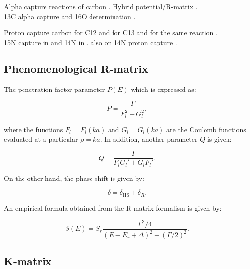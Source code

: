 \documentclass[openany]{book}
\begin{document}
Alpha capture reactions of carbon \cite{schurmann_gialanella_kunz_strieder_2012}.  Hybrid potential/R-matrix \cite{sparenberg_2005}. \\ 13C alpha capture and 16O determination \cite{prusachenko_bobrovsky_bondarenko_bokhovko_gurbich_ketlerov_2022}.

Proton capture carbon \cite{burtebaev_igamov_peterson_yarmukhamedov_zazulin_2008} for C12 and \cite{chakraborty_deboer_mukherjee_roy_2015} for C13 and \cite{genard_descouvemont_terwagne_2010} for the same reaction . \\

15N capture in \cite{barker_2008} and 14N in \cite{angulo_champagne_trautvetter_2005}. also on 14N proton capture \cite{formicola_imbriani_costantini_angulo_bemmerer_bonetti_broggini_corvisiero_cruz_descouvemont_et_2004}.

\subsection{Phenomenological R-matrix} \label{sub:rmatrix_phenomenological}

The penetration factor parameter $P(E)$ which is expressed as: 

\begin{equation} \label{eq:rmatrix_penetrationFactor}
	P= \frac{\Gamma}{F_l^2 + G_l^2},
\end{equation}

where the functions $F_l = F_l(ka)$ and $G_l = G_l(ka)$ are the Coulomb functions evaluated at a particular $\rho = ka$. In addition, another parameter $Q$ is given: 

\begin{equation} \label{eq:rmatrix_QFactor}
	Q = \frac{\Gamma}{F_lG_l' + G_lF_l'}.
\end{equation}

On the other hand, the phase shift is given by:

\begin{equation}  \label{eq:rmatrix_phaseShift}
	\delta = \delta_{\mathrm{HS}} + \delta_R.
\end{equation}

An empirical formula obtained from the R-matrix formalism is given by:

\begin{equation} \label{eq:rmatrix_sfactor}
	S(E) = S_r \frac{\Gamma^2/4}{(E-E_r + \Delta)^2 + (\Gamma/2)^2}.
\end{equation}

\subsection{K-matrix} \label{sub:kmatrix}
\end{document}
